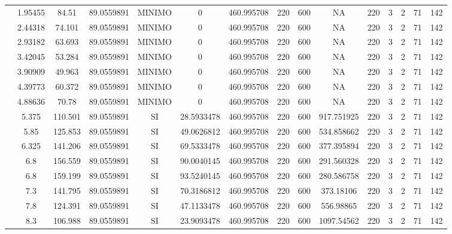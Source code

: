 \begin{table}[H]
{\begin{tabular}{|c|c|c|c|c|c|c|c|c|c|c|c|c|c|c|}
\cline{2-15}    & 1.95455 & 84.51 & 89.0559891 & MINIMO & 0   & 460.995708 & 220 & 600 & NA  & 220 & 3   & 2   & 71  & 142 \bigstrut\\
\cline{2-15}    & 2.44318 & 74.101 & 89.0559891 & MINIMO & 0   & 460.995708 & 220 & 600 & NA  & 220 & 3   & 2   & 71  & 142 \bigstrut\\
\cline{2-15}    & 2.93182 & 63.693 & 89.0559891 & MINIMO & 0   & 460.995708 & 220 & 600 & NA  & 220 & 3   & 2   & 71  & 142 \bigstrut\\
\cline{2-15}    & 3.42045 & 53.284 & 89.0559891 & MINIMO & 0   & 460.995708 & 220 & 600 & NA  & 220 & 3   & 2   & 71  & 142 \bigstrut\\
\cline{2-15}    & 3.90909 & 49.963 & 89.0559891 & MINIMO & 0   & 460.995708 & 220 & 600 & NA  & 220 & 3   & 2   & 71  & 142 \bigstrut\\
\cline{2-15}    & 4.39773 & 60.372 & 89.0559891 & MINIMO & 0   & 460.995708 & 220 & 600 & NA  & 220 & 3   & 2   & 71  & 142 \bigstrut\\
\cline{2-15}    & 4.88636 & 70.78 & 89.0559891 & MINIMO & 0   & 460.995708 & 220 & 600 & NA  & 220 & 3   & 2   & 71  & 142 \bigstrut\\
\cline{2-15}    & 5.375 & 110.501 & 89.0559891 & SI  & 28.5933478 & 460.995708 & 220 & 600 & 917.751925 & 220 & 3   & 2   & 71  & 142 \bigstrut\\
\cline{2-15}    & 5.85 & 125.853 & 89.0559891 & SI  & 49.0626812 & 460.995708 & 220 & 600 & 534.858662 & 220 & 3   & 2   & 71  & 142 \bigstrut\\
\cline{2-15}    & 6.325 & 141.206 & 89.0559891 & SI  & 69.5333478 & 460.995708 & 220 & 600 & 377.395894 & 220 & 3   & 2   & 71  & 142 \bigstrut\\
\cline{2-15}    & 6.8 & 156.559 & 89.0559891 & SI  & 90.0040145 & 460.995708 & 220 & 600 & 291.560328 & 220 & 3   & 2   & 71  & 142 \bigstrut\\
\cline{2-15}    & 6.8 & 159.199 & 89.0559891 & SI  & 93.5240145 & 460.995708 & 220 & 600 & 280.586758 & 220 & 3   & 2   & 71  & 142 \bigstrut\\
\cline{2-15}    & 7.3 & 141.795 & 89.0559891 & SI  & 70.3186812 & 460.995708 & 220 & 600 & 373.18106 & 220 & 3   & 2   & 71  & 142 \bigstrut\\
\cline{2-15}    & 7.8 & 124.391 & 89.0559891 & SI  & 47.1133478 & 460.995708 & 220 & 600 & 556.98865 & 220 & 3   & 2   & 71  & 142 \bigstrut\\
\cline{2-15}    & 8.3 & 106.988 & 89.0559891 & SI  & 23.9093478 & 460.995708 & 220 & 600 & 1097.54562 & 220 & 3   & 2   & 71  & 142 \bigstrut\\

\end{tabular}}
\end{table}
